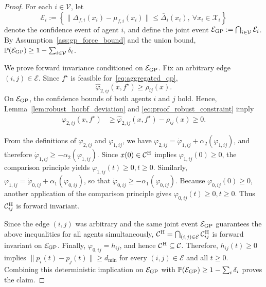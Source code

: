 \documentclass[journal,twoside,web]{ieeecolor}
\begin{document}
\begin{proof}
For each $i\in\mathcal V$, let
\[
    \mathcal E_i
    :=
    \left\{
    \|\Delta_{f,i}(x_i)-\mu_{f,i}(x_i)\|
    \leq \bar\Delta_i(x_i),
    \ \forall x_i\in\mathcal X_i
    \right\}
\]
denote the confidence event of agent $i$, and define the joint
event $\mathcal E_{\rm GP}
    :=
    \bigcap_{i\in\mathcal V}\mathcal E_i$.
By Assumption~\ref{ass:gp_force_bound} and the union bound, $\mathbb P(\mathcal E_{\rm GP})
    \geq
    1-\sum_{i\in\mathcal V}\delta_i$.

We prove forward invariance conditioned on
$\mathcal E_{\rm GP}$. Fix an arbitrary edge
$(i,j)\in\mathcal E$. Since
$f^\star$ is feasible for~\eqref{eq:aggregated_qp},
\begin{equation}
    \widehat\varphi_{2,ij}(x,f^\star)
    \geq
    \rho_{ij}(x).
    \label{eq:proof_robust_constraint}
\end{equation}
On $\mathcal E_{\rm GP}$, the confidence bounds of both
agents $i$ and $j$ hold. Hence,
Lemma~\ref{lem:robust_hocbf_deviation} and
\eqref{eq:proof_robust_constraint} imply
\[
\begin{aligned}
    \varphi_{2,ij}(x,f^\star)
    &\geq
    \widehat\varphi_{2,ij}(x,f^\star)
    -
    \rho_{ij}(x)\geq0 .
\end{aligned}
\]

From the definitions of $\varphi_{2,ij}$ and $\varphi_{1,ij}$, we have 
$\varphi_{2,ij}
    =
    \dot\varphi_{1,ij}
    +
    \alpha_2(\varphi_{1,ij})$, and therefore
$\dot\varphi_{1,ij}
    \geq
    -\alpha_2(\varphi_{1,ij})$. Since $x(0)\in\mathcal C^{\rm H}$ implies
$\varphi_{1,ij}(0)\geq0$, the comparison principle yields $\varphi_{1,ij}(t)\geq0, t\geq0$. Similarly,
$\varphi_{1,ij}
    =
    \dot\varphi_{0,ij}
    +
    \alpha_1(\varphi_{0,ij})$, so that $\dot\varphi_{0,ij}
    \geq
    -\alpha_1(\varphi_{0,ij})$. Because $\varphi_{0,ij}(0)\geq0$, another application of the
comparison principle gives
$\varphi_{0,ij}(t)\geq0, t\geq0$. Thus $\mathcal C_{ij}^{\rm H}$ is forward invariant.

Since the edge $(i,j)$ was arbitrary and the same joint event
$\mathcal E_{\rm GP}$ guarantees the above inequalities for
all agents simultaneously,
$\mathcal C^{\rm H}
    =
    \bigcap_{(i,j)\in\mathcal E}
    \mathcal C_{ij}^{\rm H}$ is forward invariant on $\mathcal E_{\rm GP}$. Finally,
$\varphi_{0,ij}=h_{ij}$, and hence
$\mathcal C^{\rm H}\subseteq\mathcal C$. Therefore,
$h_{ij}(t)\geq0$ implies $\|p_i(t)-p_j(t)\|\geq d_{\min}$ for every $(i,j)\in\mathcal E$ and all $t\geq0$.
Combining this deterministic implication on
$\mathcal E_{\rm GP}$ with
$\mathbb P(\mathcal E_{\rm GP})
\geq1-\sum_i\delta_i$
proves the claim.
\end{proof}
\end{document}
